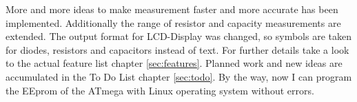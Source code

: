 More and more ideas to make measurement faster and more accurate has been implemented.
Additionally the range of resistor and capacity measurements are extended.
The output format for LCD-Display was changed, so symbols are taken for diodes, resistors and capacitors instead of text.
For further details take a look to the actual feature list chapter \ref{sec:features}.
Planned work and new ideas are accumulated in the To Do List chapter \ref{sec:todo}.
By the way, now I can program the EEprom of the ATmega with Linux operating system without errors.


